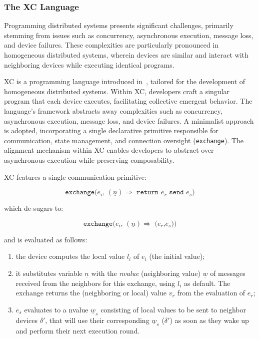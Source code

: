 \subsubsection{The XC Language}

Programming distributed systems presents significant challenges, primarily stemming from issues such as concurrency, asynchronous execution, message loss, and device failures. These complexities are particularly pronounced in homogeneous distributed systems, wherein devices are similar and interact with neighboring devices while executing identical programs.

XC is a programming language introduced in~\cite{https://doi.org/10.4230/lipics.ecoop.2022.20}, tailored for the development of homogeneous distributed systems. Within XC, developers craft a singular program that each device executes, facilitating collective emergent behavior. The language's framework abstracts away complexities such as concurrency, asynchronous execution, message loss, and device failures. A minimalist approach is adopted, incorporating a single declarative primitive responsible for communication, state management, and connection oversight (\texttt{exchange}). The alignment mechanism within XC enables developers to abstract over asynchronous execution while preserving composability.

XC features a single communication primitive:

\[ \texttt{exchange($e_i$, $(\underline{n}) \Rightarrow$ return $e_r$ send $e_s$)} \]

which de-sugars to:

\[ \texttt{exchange($e_i$, $(\underline{n}) \Rightarrow$ ($e_r$,$e_s$))} \]

and is evaluated as follows:

\begin{enumerate}
    \item the device computes the local value $l_i$ of $e_i$ (the initial value);
    \item it substitutes variable $\underline{n}$ with the \textit{nvalue} (neighboring value) $\underline{w}$ of messages received from the neighbors for this exchange, using $l_i$ as default. The exchange returns the (neighboring or local) value $v_r$ from the evaluation of $e_r$;
    \item $e_s$ evaluates to a nvalue $\underline{w}_s$ consisting of local values to be sent to neighbor devices $\delta'$, that will use their corresponding $\underline{w}_s$ ($\delta'$) as soon as they wake up and perform their next execution round.
\end{enumerate}

